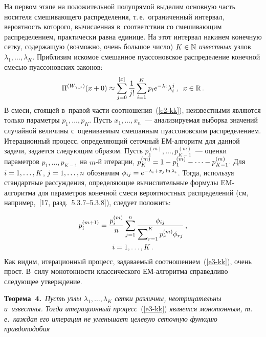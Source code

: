 \begin{multicols}{2}
На первом этапе на положительной полупрямой выделим основную часть
носителя смешивающего распределения, т.\,е.\ ограниченный интервал,
вероятность которого, вычисленная в~соответствии со смешивающим
распределением, практически равна единице. На этот интервал накинем
конечную сетку, содержащую (возможно, очень большое чис\-ло)
$K\hm\in\mathbb{N}$ \textit{известных} узлов $\lambda_1,\ldots,\lambda_K$.
Приблизим искомое смешанное пуассоновское распределение конечной
смесью пуассоновских законов:
\begin{equation}
\Pi^{(W_{\gamma,\mu})}(x+0)\approx\sum\limits_{j=0}^{[x]}
\displaystyle\frac{\displaystyle 1\mathstrut}{\displaystyle j!\mathstrut}\sum\limits_{i=1}^K p_i e^{-\lambda_i}\lambda_i^j\,,\enskip
x\in\mathbb{R}\,.
\label{e2-kk}
\end{equation}
В смеси, стоящей в~правой части соотношения~(\ref{e2-kk}), неизвестными
являются только па\-ра\-мет\-ры $p_1,\ldots,p_{K}$. Пусть $x_1,\ldots,x_n$~---
анализируемая выборка значений случайной величины с~оце\-ни\-ва\-емым
смешанным пуассоновским распределением. Итерационный процесс,
определяющий сеточный ЕМ-ал\-го\-ритм для данной задачи, задается
следующим образом. Пусть $p_1^{(m)},\ldots,p_{K-1}^{(m)}$~--- оценки
па\-ра\-мет\-ров $p_1,\ldots,p_{K-1}$ на $m$-й итерации,
$p_K^{(m)}\hm=1\hm-p_1^{(m)}-\cdots -p_{K-1}^{(m)}$. Для $i\hm=1,\ldots,K$,
$j\hm=1,\ldots,n$ обозначим $\phi_{ij}\hm=e^{-\lambda_i+x_j\ln \lambda_i}$.
Тогда, используя стандартные рассуждения, определяющие
вычислительные формулы EM-ал\-го\-рит\-ма для параметров конечной смеси
вероятностных распределений (см, например,~[17,
разд.~5.3.7--5.3.8]), следует положить:

\vspace*{-2pt}

\noindent
\begin{multline}
p_i^{(m+1)}=\displaystyle\frac{\displaystyle p_i^{(m)}\mathstrut}{\displaystyle n\mathstrut}\sum\limits_{j=1}^n
\displaystyle\frac{\displaystyle \phi_{ij}\mathstrut}{\displaystyle \sum\nolimits_{r=1}^Kp_r^{(m)}\phi_{rj}\mathstrut}\,,
\\
 i=1,\ldots,K\,.
\label{e3-kk}
\end{multline}
Как видим, итерационный процесс, задаваемый соотношением~(\ref{e3-kk}), очень
прост. В~силу монотонности классического ЕМ-алгоритма справедливо
сле\-ду\-ющее утверждение.

\smallskip

\noindent
\textbf{Теорема~4.}\ \textit{Пусть узлы $\lambda_1,\ldots,\lambda_K$ сетки
различны, неотрицательны и~известны. Тогда итерационный процесс}~(\ref{e3-kk}) 
\textit{является монотонным, т.\,е.\ каждая его итерация не уменьшает
целевую сеточную функцию правдоподобия}



\end{multicols}
